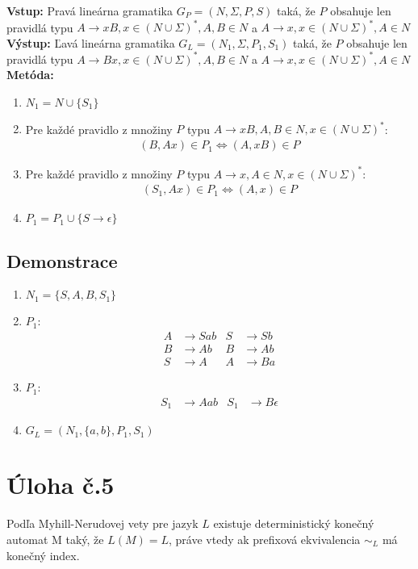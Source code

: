 \documentclass[11pt]{article}
\begin{document}
\textbf{Vstup:} Pravá lineárna gramatika $G_P = (N, \Sigma, P, S)$ taká, že $P$ obsahuje len pravidlá typu
$A\to xB, x \in (N\cup\Sigma)^*, A,B \in N$ a $A\to x, x \in (N\cup\Sigma)^*, A \in N$\\
\textbf{Výstup:} Ľavá lineárna gramatika $G_L = (N_1, \Sigma, P_1, S_1)$ taká, že $P$ obsahuje len pravidlá typu
$A\to Bx, x \in (N\cup\Sigma)^*, A,B \in N$ a $A\to x, x \in (N\cup\Sigma)^*, A \in N$\\
\textbf{Metóda:}
\begin{enumerate}
    \item $N_1 = N \cup \{S_1\}$
    \item Pre každé pravidlo z množiny $P$ typu $A\to xB, A,B \in N, x \in (N\cup\Sigma)^*$:\\
        \begin{align*}
            (B,Ax) \in P_1 \iff (A, xB) \in P
        \end{align*}
    \item Pre každé pravidlo z množiny $P$ typu $A\to x, A \in N, x \in (N\cup\Sigma)^*$:\\
        \begin{align*}
            (S_1,Ax) \in P_1 \iff (A, x) \in P
        \end{align*}
    \item $P_1 = P_1 \cup \{S\to\epsilon\}$
\end{enumerate}

\subsection*{Demonstrace}
\begin{enumerate}
    \item $N_1 = \{S, A, B, S_1\}$
    \item $P_1$: 
            \begin{align*}
                A&\to Sab  & S&\to Sb\\
                B&\to Ab   & B&\to Ab\\
                S&\to A    & A&\to Ba
            \end{align*}
    \item $P_1$: 
            \begin{align*}
                S_1&\to Aab & S_1&\to B\epsilon
            \end{align*}
    \item $G_L = (N_1, \{a,b\}, P_1, S_1)$

\end{enumerate}

\section*{Úloha č.5}
Podľa Myhill-Nerudovej vety pre jazyk $L$ existuje deterministický konečný automat M taký, že $L(M)
= L$, práve vtedy ak prefixová ekvivalencia $\sim_L$ má konečný index. 
 
\end{document}
